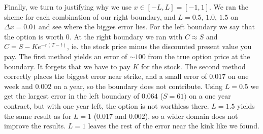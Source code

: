 Finally, we turn to justifying why we use $x \in [-L, L] = [-1, 1]$. We ran the shcme for each combination of our right boundary, and $L = 0.5,\, 1.0,\, 1.5$ on $\Delta x = 0.01$ and see where the bigges error lies. For the left boundary we say that the option is worth $0$. At the right boundary we ran with  $C \approx S$ and $C = S - K e^{-r(T -t)}$, ie. the stock price minus the discounted present value you pay. The first method yields an error of $\sim 100$ from the true option price at the boundary. It forgets that we have to pay $K$ for the stock. The second method correctly places the biggest error near strike, and a small error of $0.017$ on one week and $0.002$ on a year, so the boundary does not contribute. Using $L = 0.5$ we get the largest error in the left boundary of $0.064$ ($S = 61)$ on a one year contract, but with one year left, the option is not worthless there. $L = 1.5$ yields the same result as for $L = 1$ ($0.017$ and $0.002$), so a wider domain does not improve the results. $L= 1$ leaves the rest of the error near the kink like we found. 


